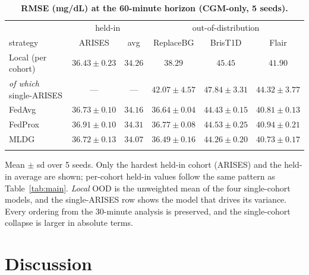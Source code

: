 \documentclass[10pt,letterpaper]{article}
\newlength\savedwidth
\newcommand\thickhline{\noalign{\global\savedwidth\arrayrulewidth\global\arrayrulewidth 2pt}%
\hline
\noalign{\global\arrayrulewidth\savedwidth}}
\begin{document}
\begin{table}[!ht]
\centering
\captionsetup{justification=centering,singlelinecheck=on}
\caption{\bf RMSE (mg/dL) at the 60-minute horizon (CGM-only, 5 seeds).}
\label{tab:h60}
\begin{tabular}{lccccc}
\thickhline
 & \multicolumn{2}{c}{held-in} & \multicolumn{3}{c}{out-of-distribution} \\
strategy & ARISES & avg & ReplaceBG & BrisT1D & Flair \\
\hline
Local (per cohort) & $36.43 \pm 0.23$ & $34.26$ & $38.29$ & $45.45$ & $41.90$ \\
\;\emph{of which} single-ARISES & --- & --- & $42.07 \pm 4.57$ & $47.84 \pm 3.31$ & $44.32 \pm 3.77$ \\
\hline
FedAvg  & $36.73 \pm 0.10$ & $34.16$ & $36.64 \pm 0.04$ & $44.43 \pm 0.15$ & $40.81 \pm 0.13$ \\
FedProx & $36.91 \pm 0.10$ & $34.31$ & $36.77 \pm 0.08$ & $44.53 \pm 0.25$ & $40.94 \pm 0.21$ \\
MLDG    & $36.72 \pm 0.13$ & $\mathbf{34.07}$ & $\mathbf{36.49 \pm 0.16}$ & $\mathbf{44.26 \pm 0.20}$ & $\mathbf{40.73 \pm 0.17}$ \\
\thickhline
\end{tabular}
\begin{center}
{\small Mean $\pm$ sd over 5 seeds. Only the hardest held-in cohort (ARISES) and
the held-in average are shown; per-cohort held-in values follow the same pattern
as Table~\ref{tab:main}. \emph{Local} OOD is the unweighted mean of the four
single-cohort models, and the single-ARISES row shows the model that drives its
variance. Every ordering from the 30-minute analysis is preserved, and the
single-cohort collapse is larger in absolute terms.}
\end{center}
\end{table}

\section*{Discussion}
\end{document}
